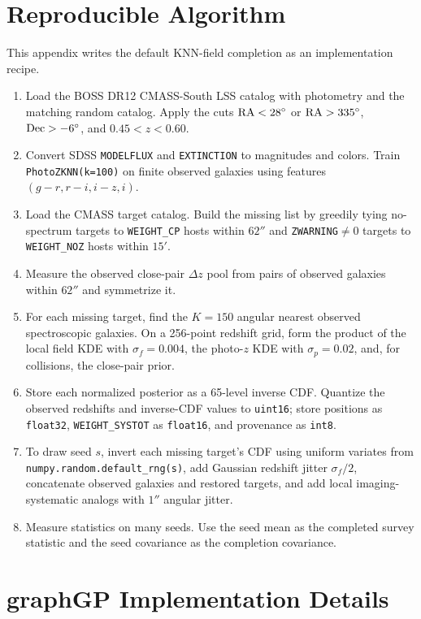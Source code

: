 \documentclass[apj]{emulateapj}
\begin{document}
\appendix

\section{Reproducible Algorithm}
\label{app:algorithm}

This appendix writes the default KNN-field completion as an implementation
recipe.

\begin{enumerate}
\item Load the BOSS DR12 CMASS-South LSS catalog with photometry and the matching
random catalog.  Apply the cuts ${\rm RA}<28^\circ$ or ${\rm RA}>335^\circ$,
${\rm Dec}>-6^\circ$, and $0.45<z<0.60$.
\item Convert SDSS \texttt{MODELFLUX} and \texttt{EXTINCTION} to magnitudes and
colors.  Train \texttt{PhotoZKNN(k=100)} on finite observed galaxies using
features $(g-r,r-i,i-z,i)$.
\item Load the CMASS target catalog.  Build the missing list by greedily tying
no-spectrum targets to \texttt{WEIGHT\_CP} hosts within $62''$ and
\texttt{ZWARNING}$\ne0$ targets to \texttt{WEIGHT\_NOZ} hosts within $15'$.
\item Measure the observed close-pair $\Delta z$ pool from pairs of observed
galaxies within $62''$ and symmetrize it.
\item For each missing target, find the $K=150$ angular nearest observed
spectroscopic galaxies.  On a 256-point redshift grid, form the product of the
local field KDE with $\sigma_f=0.004$, the photo-$z$ KDE with
$\sigma_p=0.02$, and, for collisions, the close-pair prior.
\item Store each normalized posterior as a 65-level inverse CDF.  Quantize the
observed redshifts and inverse-CDF values to \texttt{uint16}; store positions
as \texttt{float32}, \texttt{WEIGHT\_SYSTOT} as \texttt{float16}, and provenance
as \texttt{int8}.
\item To draw seed $s$, invert each missing target's CDF using uniform variates
from \texttt{numpy.random.default\_rng(s)}, add Gaussian redshift jitter
$\sigma_f/2$, concatenate observed galaxies and restored targets, and add local
imaging-systematic analogs with $1''$ angular jitter.
\item Measure statistics on many seeds.  Use the seed mean as the completed
survey statistic and the seed covariance as the completion covariance.
\end{enumerate}

\section{graphGP Implementation Details}
\label{app:graphgp}
\end{document}
